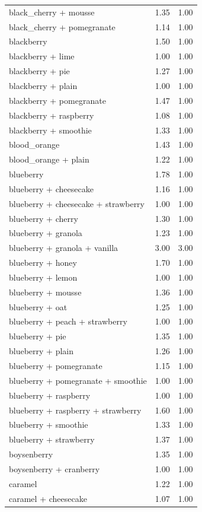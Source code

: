 \begin{table}
\begin{tabular}{lrr}
black\_cherry + mousse & 1.35 & 1.00 \\
black\_cherry + pomegranate & 1.14 & 1.00 \\
blackberry & 1.50 & 1.00 \\
blackberry + lime & 1.00 & 1.00 \\
blackberry + pie & 1.27 & 1.00 \\
blackberry + plain & 1.00 & 1.00 \\
blackberry + pomegranate & 1.47 & 1.00 \\
blackberry + raspberry & 1.08 & 1.00 \\
blackberry + smoothie & 1.33 & 1.00 \\
blood\_orange & 1.43 & 1.00 \\
blood\_orange + plain & 1.22 & 1.00 \\
blueberry & 1.78 & 1.00 \\
blueberry + cheesecake & 1.16 & 1.00 \\
blueberry + cheesecake + strawberry & 1.00 & 1.00 \\
blueberry + cherry & 1.30 & 1.00 \\
blueberry + granola & 1.23 & 1.00 \\
blueberry + granola + vanilla & 3.00 & 3.00 \\
blueberry + honey & 1.70 & 1.00 \\
blueberry + lemon & 1.00 & 1.00 \\
blueberry + mousse & 1.36 & 1.00 \\
blueberry + oat & 1.25 & 1.00 \\
blueberry + peach + strawberry & 1.00 & 1.00 \\
blueberry + pie & 1.35 & 1.00 \\
blueberry + plain & 1.26 & 1.00 \\
blueberry + pomegranate & 1.15 & 1.00 \\
blueberry + pomegranate + smoothie & 1.00 & 1.00 \\
blueberry + raspberry & 1.00 & 1.00 \\
blueberry + raspberry + strawberry & 1.60 & 1.00 \\
blueberry + smoothie & 1.33 & 1.00 \\
blueberry + strawberry & 1.37 & 1.00 \\
boysenberry & 1.35 & 1.00 \\
boysenberry + cranberry & 1.00 & 1.00 \\
caramel & 1.22 & 1.00 \\
caramel + cheesecake & 1.07 & 1.00 \\

\end{tabular}
\end{table}
